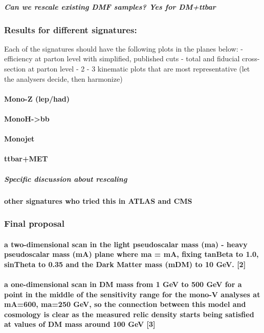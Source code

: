 \subparagraph{Can we rescale existing DMF samples? Yes for DM+ttbar}

\subsubsection{Results for different signatures:}

Each of the signatures should have the following plots in the planes
below: - efficiency at parton level with simplified, published cuts -
total and fiducial cross-section at parton level - 2 - 3 kinematic plots
that are most representative (let the analysers decide, then harmonize)

\paragraph{Mono-Z (lep/had)}

\paragraph{MonoH-\textgreater{}bb}

\paragraph{Monojet}

\paragraph{ttbar+MET}

\subparagraph{Specific discussion about rescaling}

\paragraph{other signatures who tried this in ATLAS and CMS}

\subsubsection{Final proposal}

\paragraph{a two-dimensional scan in the light pseudoscalar mass (ma) -
heavy pseudoscalar mass (mA) plane where ma = mA, fixing tanBeta to 1.0,
sinTheta to 0.35 and the Dark Matter mass (mDM) to 10 GeV. {[}2{]}}

\paragraph{a one-dimensional scan in DM mass from 1 GeV to 500 GeV for a
point in the middle of the sensitivity range for the mono-V analyses at
mA=600, ma=250 GeV, so the connection between this model and cosmology
is clear as the measured relic density starts being satisfied at values
of DM mass around 100 GeV {[}3{]}}

